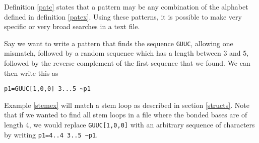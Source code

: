 Definition \ref{patc} states that a pattern may be any combination of the alphabet 
defined in definition \ref{patex}.
Using these patterns, it is possible to make very specific or very broad 
searches in a text file. 

\begin{myex}\label{stemex}
Say we want to write a pattern that finds the sequence {\tt GUUC}, allowing 
one mismatch, followed by a random sequence which has a length between 3 and 5, 
followed by the reverse complement of the first sequence that we found. We can 
then write this as \begin{center}
{\tt p1=GUUC[1,0,0] 3...5 \textasciitilde p1}
\end{center}
\end{myex}
Example \ref{stemex} will match a stem loop as described in section 
\ref{structs}. Note that if we wanted to find all stem loops in a file where 
the bonded bases are of length 
4, we would replace {\tt GUUC[1,0,0]} with an arbitrary sequence of characters 
by writing {\tt p1=4..4 3..5 \textasciitilde p1}. 
